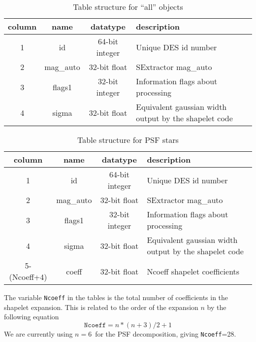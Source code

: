 \documentclass[12pt]{article}
\newcommand{\psforderval}{6}
\newcommand{\ncoeff}{\texttt{Ncoeff}}
\newcommand{\ncoeffval}{28}
\begin{document}
\begin{table}[p]
    \small
    \begin{center}
        \caption{Table structure for ``all'' objects \label{tab:allstruct}}
    \end{center}
    \begin{tabular}{cccl}
    column & name & datatype & description\\
    \hline
    1 & id       & 64-bit integer &  Unique DES id number \\
    2 & mag\_auto & 32-bit float   & SExtractor mag\_auto \\
    3 & flags1   & 32-bit integer & Information flags about processing \\
    4 & sigma    & 32-bit float   & Equivalent gaussian width output by 
                                    the shapelet code \\
    \hline
    \end{tabular}
    \normalsize
\end{table}
\begin{table}[p]
    \small
    \begin{center}
        \caption{Table structure for PSF stars \label{tab:psfstruct}}
    \end{center}
    \begin{tabular}{cccl}
    column & name & datatype & description\\
    \hline
    1 & id       & 64-bit integer &  Unique DES id number \\
    2 & mag\_auto & 32-bit float   & SExtractor mag\_auto \\
    3 & flags1   & 32-bit integer & Information flags about processing \\
    4 & sigma    & 32-bit float   & Equivalent gaussian width output by 
                                    the shapelet code \\
    5-(Ncoeff+4) & coeff & 32-bit float & Ncoeff shapelet coefficients \\
    \hline
    \end{tabular}
    \normalsize
\end{table}



The variable \texttt{Ncoeff} in the tables is the total number of coefficients
in the shapelet expansion.  This is related to the order of the expansion $n$ 
by the following equation
\begin{equation}
    \texttt{Ncoeff} = n*(n+3)/2 + 1
\end{equation}
We are currently using $n = $\psforderval\ for the PSF decomposition, giving
\ncoeff=\ncoeffval.
\end{document}
